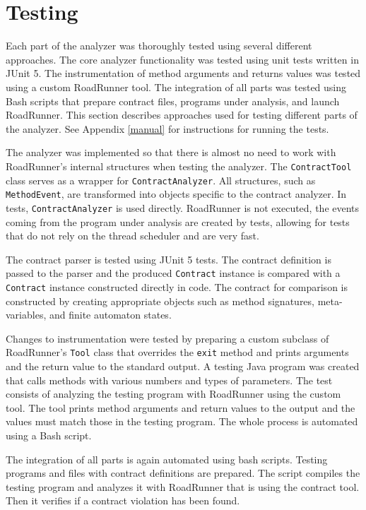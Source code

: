 \section{Testing}
\label{testing}

Each part of the analyzer was thoroughly tested using several different
approaches. The core analyzer functionality was tested using unit tests written
in JUnit 5. The instrumentation of method arguments and returns values was
tested using a custom RoadRunner tool. The integration of all parts was tested
using Bash scripts that prepare contract files, programs under analysis, and
launch RoadRunner. This section describes approaches used for testing different
parts of the analyzer. See Appendix \ref{manual} for instructions for running
the tests.

The analyzer was implemented so that there is almost no need to work with
RoadRunner's internal structures when testing the analyzer. The
\texttt{ContractTool} class serves as a wrapper for \texttt{ContractAnalyzer}.
All structures, such as \texttt{MethodEvent}, are transformed into objects
specific to the contract analyzer. In tests, \texttt{ContractAnalyzer} is used
directly. RoadRunner is not executed, the events coming from the program under
analysis are created by tests, allowing for tests that do not rely on the
thread scheduler and are very fast.

The contract parser is tested using JUnit 5 tests. The contract definition is
passed to the parser and the produced \texttt{Contract} instance is compared
with a \texttt{Contract} instance constructed directly in code. The contract for
comparison is constructed by creating appropriate objects such as method
signatures, meta-variables, and finite automaton states.

Changes to instrumentation were tested by preparing a custom subclass of
RoadRunner's \texttt{Tool} class that overrides the \texttt{exit} method and
prints arguments and the return value to the standard output. A testing Java
program was created that calls methods with various numbers and types of
parameters. The test consists of analyzing the testing program with RoadRunner
using the custom tool. The tool prints method arguments and return values to the
output and the values must match those in the testing program. The whole process
is automated using a Bash script.

The integration of all parts is again automated using bash scripts. Testing
programs and files with contract definitions are prepared. The script compiles
the testing program and analyzes it with RoadRunner that is using the contract
tool. Then it verifies if a contract violation has been found.



